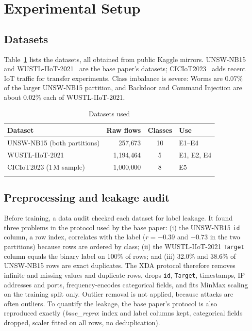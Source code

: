 \documentclass[pdflatex,sn-mathphys-num]{sn-jnl}%
\begin{document}
\section{Experimental Setup}\label{sec:setup}
\subsection{Datasets}
Table~\ref{tab:data} lists the datasets, all obtained from public Kaggle mirrors. UNSW-NB15 and WUSTL-IIoT-2021~\cite{zolanvari2021} are the base paper's datasets; CICIoT2023~\cite{neto2023} adds recent IoT traffic for transfer experiments. Class imbalance is severe: Worms are 0.07\% of the larger UNSW-NB15 partition, and Backdoor and Command Injection are about 0.02\% each of WUSTL-IIoT-2021.

\begin{table}[!htbp]
\caption{Datasets used}\label{tab:data}%
\begin{tabular}{@{}lrcl@{}}
\toprule
Dataset & Raw flows & Classes & Use \\
\midrule
UNSW-NB15 (both partitions) & 257{,}673 & 10 & E1--E4 \\
WUSTL-IIoT-2021 & 1{,}194{,}464 & 5 & E1, E2, E4 \\
CICIoT2023 (1\,M sample) & 1{,}000{,}000 & 8 & E5 \\
\botrule
\end{tabular}
\end{table}

\subsection{Preprocessing and leakage audit}\label{subsec:prep}
Before training, a data audit checked each dataset for label leakage. It found three problems in the protocol used by the base paper: (i) the UNSW-NB15 \texttt{id} column, a row index, correlates with the label ($r=-0.39$ and $+0.73$ in the two partitions) because rows are ordered by class; (ii) the WUSTL-IIoT-2021 \texttt{Target} column equals the binary label on 100\% of rows; and (iii) 32.0\% and 38.6\% of UNSW-NB15 rows are exact duplicates. The XDA protocol therefore removes infinite and missing values and duplicate rows, drops \texttt{id}, \texttt{Target}, timestamps, IP addresses and ports, frequency-encodes categorical fields, and fits MinMax scaling on the training split only. Outlier removal is not applied, because attacks are often outliers. To quantify the leakage, the base paper's protocol is also reproduced exactly (\textit{base\_repro}: index and label columns kept, categorical fields dropped, scaler fitted on all rows, no deduplication).
\end{document}
